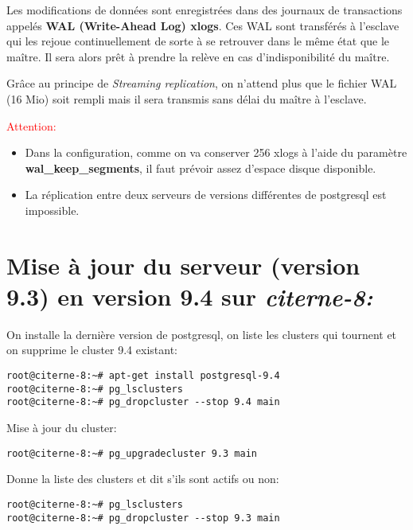 Les modifications de données sont enregistrées dans des journaux de transactions appelés \textbf{WAL (Write-Ahead Log) xlogs}. Ces WAL sont transférés à l'esclave qui les rejoue continuellement de sorte à se retrouver dans le même état que le maître. Il sera alors prêt à prendre la relève en cas d'indisponibilité du maître.

Grâce au principe de \textit{Streaming replication}, on n'attend plus que le fichier WAL (16 Mio) soit rempli mais il sera transmis sans délai du maître à l'esclave.

\textcolor{Red}{Attention:}
\begin{itemize}
\item Dans la configuration, comme on va conserver 256 xlogs à l'aide du paramètre \textbf{wal\_keep\_segments}, il faut prévoir assez d'espace disque disponible.
\item La réplication entre deux serveurs de versions différentes de postgresql est impossible.
\end{itemize}

\newpage
\section{Mise à jour du serveur (version 9.3) en version 9.4 sur \textit{citerne-8:}}

On installe la dernière version de postgresql, on liste les clusters qui tournent et on supprime le cluster 9.4 existant:

\smallskip
\begin{Verbatim}[frame=single,framerule=1mm,framesep=3mm,rulecolor=\color{brown}]
root@citerne-8:~# apt-get install postgresql-9.4
root@citerne-8:~# pg_lsclusters
root@citerne-8:~# pg_dropcluster --stop 9.4 main
\end{Verbatim}


\vspace{2mm}

Mise à jour du cluster:
\smallskip
\begin{Verbatim}[frame=single,framerule=1mm,framesep=3mm,rulecolor=\color{brown}]
root@citerne-8:~# pg_upgradecluster 9.3 main 
\end{Verbatim}

\vspace{2mm}

Donne la liste des clusters et dit s'ils sont actifs ou non: 
\smallskip
\begin{Verbatim}[frame=single,framerule=1mm,framesep=3mm,rulecolor=\color{brown}]
root@citerne-8:~# pg_lsclusters
root@citerne-8:~# pg_dropcluster --stop 9.3 main
\end{Verbatim}

